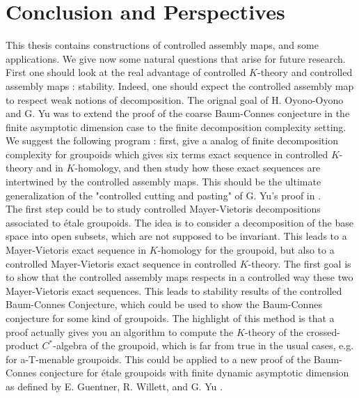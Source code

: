 \chapter{Conclusion and Perspectives}

This thesis contains constructions of controlled assembly maps, and some applications. We give now some natural questions that arise for future research.\\ 

First one should look at the real advantage of controlled $K$-theory and controlled assembly maps : stability. Indeed, one should expect the controlled assembly map to respect weak notions of decomposition. The orignal goal of H. Oyono-Oyono and G. Yu was to extend the proof of the coarse Baum-Connes conjecture in the finite asymptotic dimension case to the finite decomposition complexity setting. We suggest the following program : first, give a analog of finite decomposition complexity for groupoids which gives six terms exact sequence in controlled $K$-theory and in $K$-homology, and then study how these exact sequences are intertwined by the controlled assembly maps. This should be the ultimate generalization of the "controlled cutting and pasting" of G. Yu's proof in \cite{Yu1}.\\

The first step could be to study controlled Mayer-Vietoris decompositions associated to étale groupoids. The idea is to consider a decomposition of the base space into open subsets, which are not supposed to be invariant. This leads to a Mayer-Vietoris exact sequence in $K$-homology for the groupoid, but also to a controlled Mayer-Vietoris exact sequence in controlled $K$-theory. The first goal is to show that the controlled assembly maps respects in a controlled way these two Mayer-Vietoris exact sequences. This leads to stability results of the controlled Baum-Connes Conjecture, which could be used to show the Baum-Connes conjecture for some kind of groupoids. The highlight of this method is that a proof actually gives you an algorithm to compute the $K$-theory of the crossed-product $C^*$-algebra of the groupoid, which is far from true in the usual cases, e.g. for a-T-menable groupoids. %
This could be applied to a new proof of the Baum-Connes conjecture for étale groupoids with finite dynamic asymptotic dimension as defined by E. Guentner, R. Willett, and G. Yu \cite{GWY}.\\


